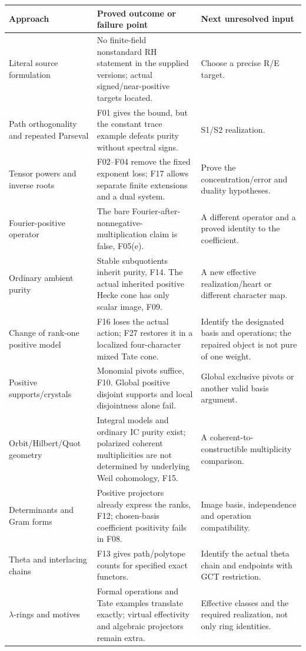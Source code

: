 \documentclass[11pt,a4paper]{article}
\theoremstyle{named}\newtheorem{finding}{Finding}[section]
\theoremstyle{definition}\newtheorem{definition}[finding]{Definition}
\theoremstyle{remark}\newtheorem{remark}[finding]{Remark}
\begin{document}
{\small\begin{longtable}{p{.23\linewidth}p{.40\linewidth}p{.29\linewidth}}
\toprule Approach&Proved outcome or failure point&Next unresolved input\\\midrule\endhead
Literal source formulation&No finite-field nonstandard RH statement in the supplied versions; actual signed/near-positive targets located.&Choose a precise R/E target.\\
Path orthogonality and repeated Parseval&F01 gives the bound, but the constant trace example defeats purity without spectral signs.&S1/S2 realization.\\
Tensor powers and inverse roots&F02--F04 remove the fixed exponent loss; F17 allows separate finite extensions and a dual system.&Prove the concentration/error and duality hypotheses.\\
Fourier-positive operator&The bare Fourier-after-nonnegative-multiplication claim is false, F05(e).&A different operator and a proved identity to the coefficient.\\
Ordinary ambient purity&Stable subquotients inherit purity, F14. The actual inherited positive Hecke cone has only scalar image, F09.&A new effective realization/heart or different character map.\\
Change of rank-one positive model&F16 loses the actual action; F27 restores it in a localized four-character mixed Tate cone.&Identify the designated basis and operations; the repaired object is not pure of one weight.\\
Positive supports/crystals&Monomial pivots suffice, F10. Global positive disjoint supports and local disjointness alone fail.&Global exclusive pivots or another valid basis argument.\\
Orbit/Hilbert/Quot geometry&Integral models and ordinary IC purity exist; polarized coherent multiplicities are not determined by underlying Weil cohomology, F15.&A coherent-to-constructible multiplicity comparison.\\
Determinants and Gram forms&Positive projectors already express the ranks, F12; chosen-basis coefficient positivity fails in F08.&Image basis, independence and operation compatibility.\\
Theta and interlacing chains&F13 gives path/polytope counts for specified exact functors.&Identify the actual theta chain and endpoints with GCT restriction.\\
$\lambda$-rings and motives&Formal operations and Tate examples translate exactly; virtual effectivity and algebraic projectors remain extra.&Effective classes and the required realization, not only ring identities.\\\bottomrule
\end{longtable}}
\end{document}
